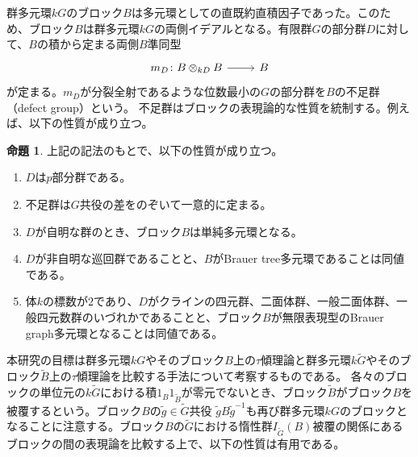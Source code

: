 \documentclass[a4paper,uplatex,dvipdfmx]{jsarticle}
\theoremstyle{definition}
\newtheorem{proposition}[theorem]{命題}
\newcommand{\inertiagp}{I}
\begin{document}
群多元環\(kG\)のブロック\(B\)は多元環としての直既約直積因子であった。このため、ブロック\(B\)は群多元環\(kG\)の両側イデアルとなる。有限群\(G\)の部分群\(D\)に対して、\(B\)の積から定まる両側\(B\)準同型
\begin{equation}
  \begin{tikzcd}
    m_D\colon B\otimes_{kD}B\ar[r]&B
  \end{tikzcd}
\end{equation}
が定まる。\(m_D\)が分裂全射であるような位数最小の\(G\)の部分群を\(B\)の不足群（defect group）という。
不足群はブロックの表現論的な性質を統制する。例えば、以下の性質が成り立つ。
\begin{proposition}\label{defect prop 2021-07-01 15:26:27}
  上記の記法のもとで、以下の性質が成り立つ。
  \begin{enumerate}
    \item \(D\)は\(p\)部分群である。
    \item 不足群は\(G\)共役の差をのぞいて一意的に定まる。
    \item \(D\)が自明な群のとき、ブロック\(B\)は単純多元環となる。\label{trivial defect 2021-07-01 15:34:41}
    \item \(D\)が非自明な巡回群であることと、\(B\)がBrauer tree多元環であることは同値である。\label{cyclic defect 2021-07-01 15:34:52}
    \item 体\(k\)の標数が\(2\)であり、\(D\)がクラインの四元群、二面体群、一般二面体群、一般四元数群のいづれかであることと、ブロック\(B\)が無限表現型のBrauer graph多元環となることは同値である。\label{Erd defect 2021-07-01 15:35:07}
  \end{enumerate}
\end{proposition}
本研究の目標は群多元環\(kG\)やそのブロック\(B\)上の\(\tau\)傾理論と群多元環\(k\widetilde{G}\)やそのブロック\(\widetilde{B}\)上の\(\tau\)傾理論を比較する手法について考察するものである。
各々のブロックの単位元の\(k\widetilde{G}\)における積\(1_B1_{\widetilde{B}}\)が零元でないとき、ブロック\(\widetilde{B}\)がブロック\(B\)を被覆するという。ブロック\(B\)の\(\widetilde{g}\in \widetilde{G}\)共役
\(\widetilde{g}B\widetilde{g}^{-1}\)も再び群多元環\(kG\)のブロックとなることに注意する。ブロック\(B\)の\(\widetilde{G}\)における惰性群\(\inertiagp_{\widetilde{G}}(B)\)被覆の関係にあるブロックの間の表現論を比較する上で、以下の性質は有用である。
\end{document}
